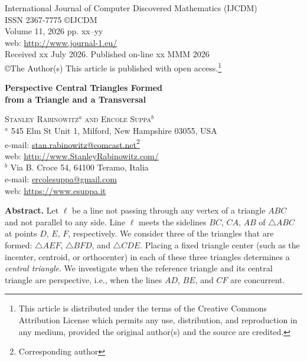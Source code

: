 \documentclass[12pt,a4paper]{amsart}
\theoremstyle{remark}
\begin{document}
International Journal of  Computer Discovered Mathematics (IJCDM) \\
ISSN 2367-7775 \copyright IJCDM \\
Volume 11, 2026 pp. xx--yy  \\
web: \url{http://www.journal-1.eu/} \\
Received xx July 2026. Published on-line xx MMM 2026\\ 

\copyright The Author(s) This article is published 
with open access.\footnote{This article is distributed under the terms of the Creative Commons Attribution License which permits any use, distribution, and reproduction in any medium, provided the original author(s) and the source are credited.} \\
\bigskip
\bigskip

\begin{center}
	{\Large \textbf{Perspective Central Triangles Formed\\from a Triangle and a Transversal}} \\
	\medskip
	\bigskip
        \bigskip

	\textsc{Stanley Rabinowitz$^a$ and Ercole Suppa$^b$} \\

	$^a$ 545 Elm St Unit 1,  Milford, New Hampshire 03055, USA \\
	e-mail: \href{mailto:stan.rabinowitz@comcast.net}{stan.rabinowitz@comcast.net}\footnote{Corresponding author} \\
	web: \url{http://www.StanleyRabinowitz.com/} \\
	
	$^b$ Via B. Croce 54, 64100 Teramo, Italia \\
	e-mail: \href{mailto:ercolesuppa@gmail.com}{ercolesuppa@gmail.com} \\
	web: \url{https://www.esuppa.it} \\
	
\bigskip

\end{center}
\bigskip

\newcommand{\LL}{\ell }


\textbf{Abstract.}
Let $\LL$ be a line not passing through any vertex of a triangle $ABC$ and not parallel to any side.
Line $\LL$ meets the sidelines $BC$, $CA$, $AB$ of $\triangle ABC$ at points $D$, $E$, $F$,
respectively.
We consider three of the triangles that are formed: $\triangle AEF$, $\triangle BFD$, and $\triangle CDE$.
Placing a fixed triangle center
(such as the incenter, centroid, or orthocenter) in each of these three triangles
determines a \emph{central triangle}. We investigate when the reference triangle and
its central triangle are perspective, i.e., when the lines $AD$, $BE$, and $CF$ are concurrent.
\end{document}
